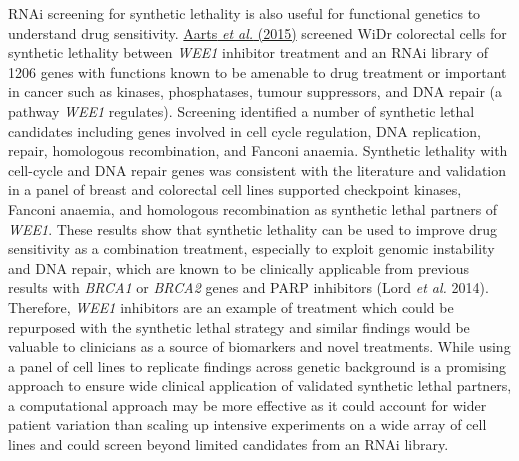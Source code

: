 RNAi screening for synthetic lethality is also useful for functional genetics to understand drug sensitivity. \hyperlink{ENREF1}{Aarts}\hyperlink{ENREF1}{\textit{ et al.}}\hyperlink{ENREF1}{ (2015)} screened WiDr colorectal cells for synthetic lethality between \textit{WEE1} inhibitor treatment and an RNAi library of 1206 genes with functions known to be amenable to drug treatment or important in cancer such as kinases, phosphatases, tumour suppressors, and DNA repair (a pathway \textit{WEE1} regulates). Screening identified a number of synthetic lethal candidates including genes involved in cell cycle regulation, DNA replication, repair, homologous recombination, and Fanconi anaemia. Synthetic lethality with cell-cycle and DNA repair genes was consistent with the literature and validation in a panel of breast and colorectal cell lines supported checkpoint kinases, Fanconi anaemia, and homologous recombination as synthetic lethal partners of \textit{WEE1}. These results show that synthetic lethality can be used to improve drug sensitivity as a combination treatment, especially to exploit genomic instability and DNA repair, which are known to be clinically applicable from previous results with \textit{BRCA1} or \textit{BRCA2} genes and PARP inhibitors (Lord\textit{ et al.} 2014). Therefore, \textit{WEE1} inhibitors are an example of treatment which could be repurposed with the synthetic lethal strategy and similar findings would be valuable to clinicians as a source of biomarkers and novel treatments. While using a panel of cell lines to replicate findings across genetic background is a promising approach to ensure wide clinical application of validated synthetic lethal partners, a computational approach may be more effective as it could account for wider patient variation than scaling up intensive experiments on a wide array of cell lines and could screen beyond limited candidates from an RNAi library.  

